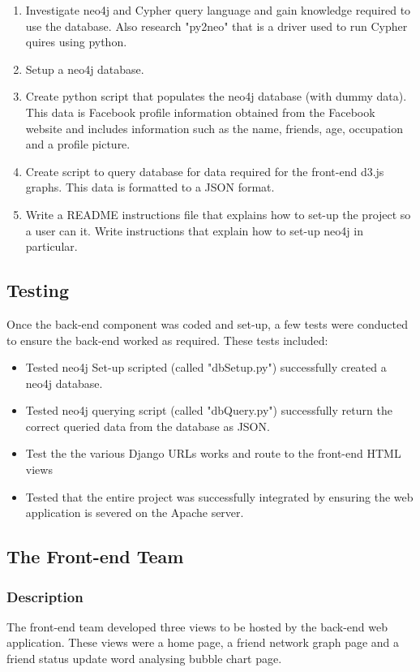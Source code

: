 \documentclass[10pt,onecolumn]{article}
\begin{document}
\begin{enumerate}
	\item Investigate neo4j and Cypher query language and gain knowledge required to use the database. Also research "py2neo" that is a driver used to run Cypher quires using python.
	\item Setup a neo4j database.
	\item Create python script that populates the neo4j database (with dummy data). This data is Facebook profile information obtained from the Facebook website and includes information such as the name, friends, age, occupation and a profile picture.
	\item Create script to query database for data required for the front-end d3.js graphs. This data is formatted to a JSON format.
	\item Write a README instructions file that explains how to set-up the project so a user can it. Write instructions that explain how to set-up neo4j in particular.

	  
\end{enumerate}

\subsection{Testing}
Once the back-end component was coded and set-up, a few tests were conducted to ensure the back-end worked as required. These tests included:

\begin{itemize}
	\item Tested neo4j Set-up scripted (called "dbSetup.py") successfully created a neo4j database.
	\item Tested neo4j querying script (called  "dbQuery.py") successfully return the correct queried data from the database as JSON.
	\item Test the the various Django URLs works and route to the front-end HTML views 
	\item Tested that the entire project was successfully integrated by ensuring the web application is severed on the Apache server.
\end{itemize}


\subsection{The Front-end Team}
\subsubsection{Description}
The front-end team developed three views to be hosted by the back-end web application. These views were a home page, a friend network graph page and a friend status update word analysing bubble chart page. 
\end{document}
